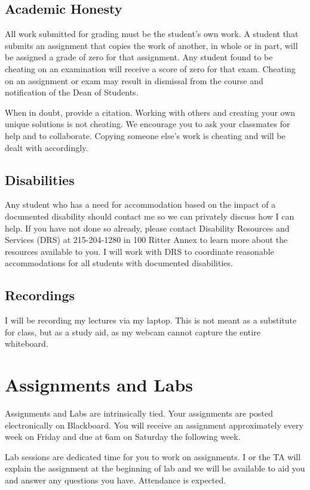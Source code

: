 \documentclass[10pt, letter]{article}
\begin{document}
\subsection*{Academic Honesty}
All work submitted for grading must be the student's own work. A student that submits an assignment that copies the work of another, in whole or in part, will be assigned a grade of zero for that assignment. Any student found to be cheating on an examination will receive a score of zero for that exam. Cheating on an assignment or exam may result in dismissal from the course and notification of the Dean of Students.

When in doubt, provide a citation.
Working with others and creating your own unique solutions is not cheating.
We encourage you to ask your classmates for help and to collaborate.
Copying someone else's work is cheating and will be dealt with accordingly.


\subsection*{Disabilities}
Any student who has a need for accommodation based on the impact of a documented disability should contact me so we can privately discuss how I can help. 
If you have not done so already, please contact Disability Resources and Services (DRS) at 215-204-1280 in 100 Ritter Annex to learn more about the resources available to you.
I will work with DRS to coordinate reasonable accommodations for all students with documented disabilities.


\subsection*{Recordings}
I will be recording my lectures via my laptop.
This is not meant as a substitute for class, but as a study aid, as my webcam cannot capture the entire whiteboard.

\section{Assignments and Labs}
Assignments and Labs are intrinsically tied.
Your assignments are posted electronically on Blackboard.
You will receive an assignment approximately every week on Friday and due at 6am on Saturday the following week.

Lab sessions are dedicated time for you to work on assignments.
I or the TA will explain the assignment at the beginning of lab and we will be available to aid you and answer any questions you have.
Attendance is expected.
\end{document}
